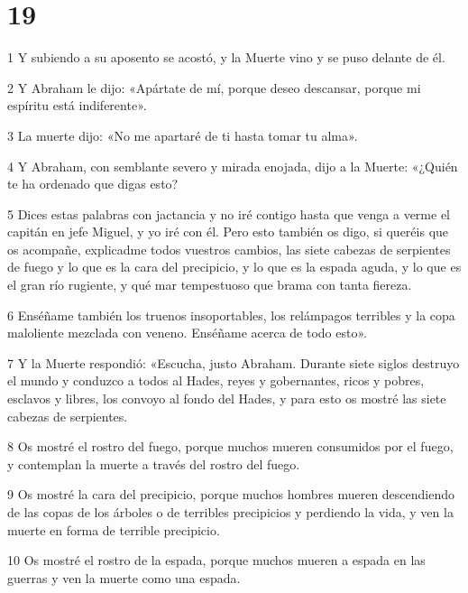 \chapter{19}

\par 1 Y subiendo a su aposento se acostó, y la Muerte vino y se puso delante de él.

\par 2 Y Abraham le dijo: «Apártate de mí, porque deseo descansar, porque mi espíritu está indiferente».

\par 3 La muerte dijo: «No me apartaré de ti hasta tomar tu alma».

\par 4 Y Abraham, con semblante severo y mirada enojada, dijo a la Muerte: «¿Quién te ha ordenado que digas esto?

\par 5 Dices estas palabras con jactancia y no iré contigo hasta que venga a verme el capitán en jefe Miguel, y yo iré con él. Pero esto también os digo, si queréis que os acompañe, explicadme todos vuestros cambios, las siete cabezas de serpientes de fuego y lo que es la cara del precipicio, y lo que es la espada aguda, y lo que es el gran río rugiente, y qué mar tempestuoso que brama con tanta fiereza.

\par 6 Enséñame también los truenos insoportables, los relámpagos terribles y la copa maloliente mezclada con veneno. Enséñame acerca de todo esto».

\par 7 Y la Muerte respondió: «Escucha, justo Abraham. Durante siete siglos destruyo el mundo y conduzco a todos al Hades, reyes y gobernantes, ricos y pobres, esclavos y libres, los convoyo al fondo del Hades, y para esto os mostré las siete cabezas de serpientes.

\par 8 Os mostré el rostro del fuego, porque muchos mueren consumidos por el fuego, y contemplan la muerte a través del rostro del fuego.

\par 9 Os mostré la cara del precipicio, porque muchos hombres mueren descendiendo de las copas de los árboles o de terribles precipicios y perdiendo la vida, y ven la muerte en forma de terrible precipicio.

\par 10 Os mostré el rostro de la espada, porque muchos mueren a espada en las guerras y ven la muerte como una espada.

